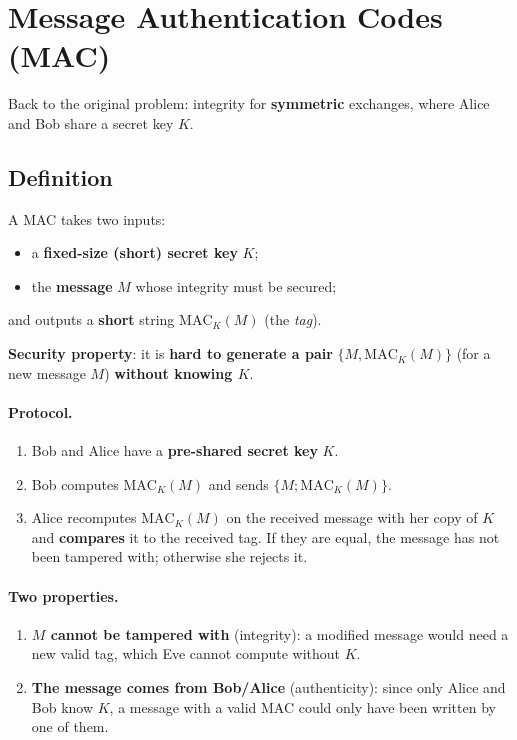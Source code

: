\section{Message Authentication Codes (MAC)}

Back to the original problem: integrity for \textbf{symmetric} exchanges, where Alice and Bob share a secret key $K$.

\subsection{Definition}

\begin{definition}
A MAC takes two inputs:
\begin{itemize}
    \item a \textbf{fixed-size (short) secret key} $K$;
    \item the \textbf{message} $M$ whose integrity must be secured;
\end{itemize}
and outputs a \textbf{short} string $\mathrm{MAC}_K(M)$ (the \emph{tag}).

\textbf{Security property}: it is \textbf{hard to generate a pair} $\{M, \mathrm{MAC}_K(M)\}$ (for a new message $M$) \textbf{without knowing $K$}.
\end{definition}

\paragraph{Protocol.}
\begin{enumerate}
    \item Bob and Alice have a \textbf{pre-shared secret key} $K$.
    \item Bob computes $\mathrm{MAC}_K(M)$ and sends $\{M; \mathrm{MAC}_K(M)\}$.
    \item Alice recomputes $\mathrm{MAC}_K(M)$ on the received message with her copy of $K$ and \textbf{compares} it to the received tag. If they are equal, the message has not been tampered with; otherwise she rejects it.
\end{enumerate}

\paragraph{Two properties.}
\begin{enumerate}
    \item \textbf{$M$ cannot be tampered with} (integrity): a modified message would need a new valid tag, which Eve cannot compute without $K$.
    \item \textbf{The message comes from Bob/Alice} (authenticity): since only Alice and Bob know $K$, a message with a valid MAC could only have been written by one of them.
\end{enumerate}

